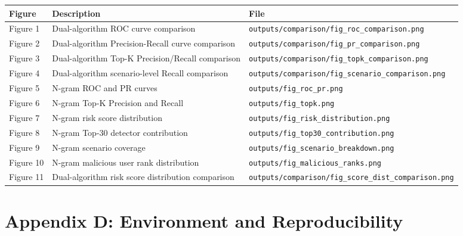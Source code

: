 \documentclass[
  a4paper,
  11pt]{article}
\newcounter{none} %
\begin{document}
{\def\LTcaptype{none} %
\begin{longtable}[]{@{}L{0.24}L{0.26}L{0.42}@{}}
\toprule\noalign{}
Figure & Description & File \\
\midrule\noalign{}
\endhead
\bottomrule\noalign{}
\endlastfoot
Figure 1 & Dual-algorithm ROC curve comparison &
\texttt{outputs/comparison/fig\_roc\_comparison.png} \\
Figure 2 & Dual-algorithm Precision-Recall curve comparison &
\texttt{outputs/comparison/fig\_pr\_comparison.png} \\
Figure 3 & Dual-algorithm Top-K Precision/Recall comparison &
\texttt{outputs/comparison/fig\_topk\_comparison.png} \\
Figure 4 & Dual-algorithm scenario-level Recall comparison &
\texttt{outputs/comparison/fig\_scenario\_comparison.png} \\
Figure 5 & N-gram ROC and PR curves &
\texttt{outputs/fig\_roc\_pr.png} \\
Figure 6 & N-gram Top-K Precision and Recall &
\texttt{outputs/fig\_topk.png} \\
Figure 7 & N-gram risk score distribution &
\texttt{outputs/fig\_risk\_distribution.png} \\
Figure 8 & N-gram Top-30 detector contribution &
\texttt{outputs/fig\_top30\_contribution.png} \\
Figure 9 & N-gram scenario coverage &
\texttt{outputs/fig\_scenario\_breakdown.png} \\
Figure 10 & N-gram malicious user rank distribution &
\texttt{outputs/fig\_malicious\_ranks.png} \\
Figure 11 & Dual-algorithm risk score distribution comparison &
\texttt{outputs/comparison/fig\_score\_dist\_comparison.png} \\
\end{longtable}
}

\section{Appendix D: Environment and
Reproducibility}\label{appendix-d-environment-and-reproducibility}
\end{document}
